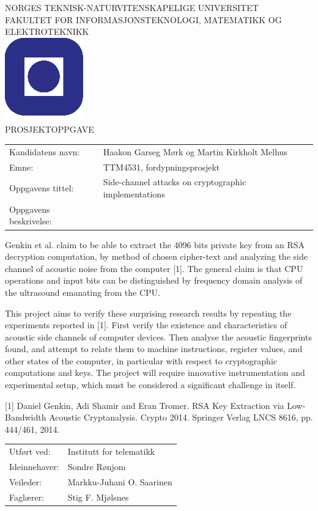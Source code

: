\documentclass[a4paper,11pt]{article}
\begin{document}
\sffamily
\begin{titlepage}
\begin{center}
\textsc{NORGES TEKNISK-NATURVITENSKAPELIGE UNIVERSITET\\
FAKULTET FOR INFORMASJONSTEKNOLOGI, MATEMATIKK OG ELEKTROTEKNIKK} \\
\vspace{0.5cm} 
\includegraphics[scale=0.5]{NTNU-logo} \\
\vspace{1.0cm}
{\Huge{PROSJEKTOPPGAVE}}
\vspace{1.0cm}
\end{center}

\begin{tabular}{@{}p{5cm}l}
Kandidatens navn:	& Haakon Garseg Mørk og Martin Kirkholt Melhus\\
Emne:			& TTM4531, fordypningsprosjekt\\
Oppgavens tittel: 	& Side-channel attacks on cryptographic implementations \\
Oppgavens beskrivelse: 	& \\
\end{tabular}

Genkin et al. claim to be able to extract the 4096 bits private key from an RSA decryption computation, 
by method of chosen cipher-text and analyzing the side channel of acoustic noise from the computer [1].
The general claim is that CPU operations and input bits can be distinguished by frequency domain analysis
of the ultrasound emanating from the CPU.

This project aims to verify these surprising research results by repeating the experiments reported in [1].
First verify the existence and characteristics of acoustic side channels of computer devices. 
Then analyse the acoustic fingerprints found, and attempt to relate them to machine instructions,
register values, and other states of the computer, in particular with respect to cryptographic computations and keys.
The project will require innovative instrumentation and experimental setup,
which must be considered a significant challenge in itself.

[1] Daniel Genkin, Adi Shamir and Eran Tromer.  RSA Key Extraction via Low-Bandwidth Acoustic Cryptanalysis.
Crypto 2014. Springer Verlag LNCS 8616, pp. 444/461, 2014.

\begin{tabular}{@{}p{5cm}l}
Utf\o{}rt ved:	& Institutt for telematikk \\
Ideinnehaver:	& Sondre Rønjom \\
Veileder:	& Markku-Juhani O. Saarinen \\
Fagl\ae{}rer: 	& Stig F. Mjølsnes \\
\end{tabular}

\end{titlepage}
\end{document}
